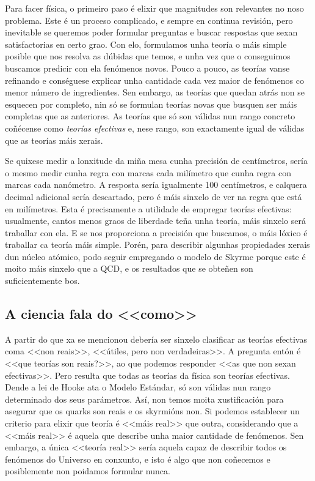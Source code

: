 \begin{multicols}{2}
Para facer física, o primeiro paso é elixir que magnitudes son relevantes no
noso problema. Este é un proceso complicado, e sempre en continua revisión,
pero inevitable se queremos poder formular preguntas e buscar respostas que
sexan satisfactorias en certo grao. Con elo, formulamos unha teoría o máis
simple posible que nos resolva as dúbidas que temos, e unha vez que o
conseguimos buscamos predicir con ela fenómenos novos. Pouco a pouco, as
teorías vanse refinando e conséguese explicar unha cantidade cada vez maior de
fenómenos co menor número de ingredientes. Sen embargo, as teorías que quedan
atrás non se esquecen por completo, nin só se formulan teorías novas que
busquen ser máis completas que as anteriores. As teorías que só son válidas nun
rango concreto coñécense como \textit{teorías efectivas} e, nese rango, son
exactamente igual de válidas que as teorías máis xerais.

Se quixese medir a lonxitude da miña mesa cunha precisión de centímetros, sería
o mesmo medir cunha regra con marcas cada milímetro que cunha regra con marcas
cada nanómetro. A resposta sería igualmente 100 centímetros, e calquera decimal
adicional sería descartado, pero é máis sinxelo de ver na regra que está en
milímetros. Esta é precisamente a utilidade de empregar teorías efectivas:
usualmente, cantos menos graos de liberdade teña unha teoría, máis sinxelo será
traballar con ela. E se nos proporciona a precisión que buscamos, o máis lóxico
é traballar ca teoría máis simple. Porén, para describir algunhas propiedades
xerais dun núcleo atómico, podo seguir empregando o modelo de Skyrme porque
este é moito máis sinxelo que a QCD, e os resultados que se obteñen son
suficientemente bos.

\subsection*{A ciencia fala do <<como>>}

A partir do que xa se mencionou debería ser sinxelo clasificar as teorías
efectivas coma <<non reais>>, <<útiles, pero non verdadeiras>>. A pregunta
entón é <<que teorías son reais?>>, ao que podemos responder <<as que non sexan
efectivas>>. Pero resulta que todas as teorías da física son teorías efectivas.
Dende a lei de Hooke ata o Modelo Estándar, só son válidas nun rango
determinado dos seus parámetros. Así, non temos moita xustificación para
asegurar que os quarks son reais e os skyrmións non. Si podemos establecer un
criterio para elixir que teoría é <<máis real>> que outra, considerando que a
<<máis real>> é aquela que describe unha maior cantidade de fenómenos. Sen
embargo, a única <<teoría real>> sería aquela capaz de describir todos os
fenómenos do Universo en conxunto, e isto é algo que non coñecemos e
posiblemente non poidamos formular nunca.


\end{multicols}
